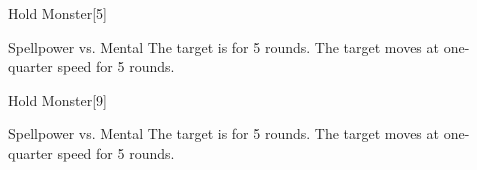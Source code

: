 \begin{spellsection}{Hold Monster}[5]
    \begin{spellheader}
    \end{spellheader}
    \begin{spellcontent}
        \begin{spelltargetinginfo}
        \end{spelltargetinginfo}
        \begin{spelleffects}
            \begin{spellattack}{Spellpower vs. Mental}
                \spellsuccess The target is \immobilized for 5 rounds.
                \spellfailure The target moves at one-quarter speed for 5 rounds.
            \end{spellattack}
        \end{spelleffects}
    \end{spellcontent}
    \begin{spellfooter}
        \miscastrandom
    \end{spellfooter}
\end{spellsection}

\begin{spellsection}[Mass]{Hold Monster}[9]
    \begin{spellheader}
    \end{spellheader}
    \begin{spellcontent}
        \begin{spelltargetinginfo}
        \end{spelltargetinginfo}
        \begin{spelleffects}
            \begin{spellattack}{Spellpower vs. Mental}
                \spellsuccess The target is \immobilized for 5 rounds.
                \spellfailure The target moves at one-quarter speed for 5 rounds.
            \end{spellattack}
        \end{spelleffects}
    \end{spellcontent}
    \begin{spellfooter}
        \miscastexplode
    \end{spellfooter}
\end{spellsection}

